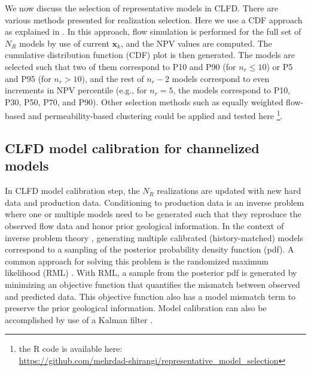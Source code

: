 \documentclass[11pt]{article}
\begin{document}
We now discuss the selection of representative models in CLFD.
There are various methods presented for realization selection. Here we use a CDF approach as explained in \citet{shirangi:17}.
In this approach, flow simulation is performed for the full set of $N_R$ models by use of current $\mathbf{x}_k$, and the NPV values are computed.
The cumulative distribution function (CDF) plot is then generated. The models are selected such that two of them
correspond to P10 and P90 (for $n_r \le 10$) or P5 and P95 (for $n_r > 10$), and the rest of $n_r-2$ models correspond to even increments in NPV percentile (e.g., for $n_r=5$, the models correspond to P10, P30, P50, P70, and P90).
Other selection methods such as equally weighted flow-based and permeability-based clustering \citep{shirangi:16b} could be applied and tested here
\footnote{the R code is available here:\\ \url{https://github.com/mehrdad-shirangi/representative_model_selection}}.

\subsection{CLFD model calibration for channelized models} \label{HM-opca}
In CLFD model calibration step,
the $N_R$ realizations are updated with new hard data and production data.
Conditioning to production data is an inverse problem where one or multiple models need to be generated
such that they reproduce the observed flow data and honor prior geological information.
In the context of inverse problem theory \citep{tarantola:05},
generating multiple calibrated (history-matched) models correspond to a sampling of the posterior probability density function (pdf).
A common approach for solving this problem
is the randomized maximum likelihood (RML) \citep{kitanidis:95,shirangi:14}.
With RML, a sample from the posterior pdf is generated by minimizing
an objective function that quantifies the mismatch between observed and predicted data.
This objective function also has a model mismatch term to preserve the prior geological information.
Model calibration can also be accomplished by use of a Kalman filter \citep{ghorbanidehno:15,ghorbanidehno:18}. %
\end{document}

